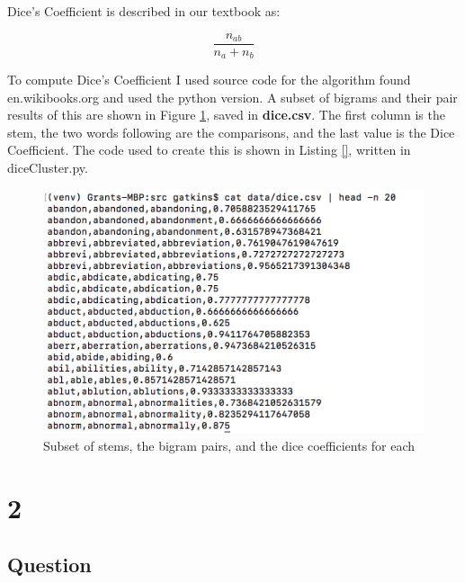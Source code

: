 \documentclass[letterpaper,11pt]{article}
\newcommand*{\srcPath}{../src}%
\begin{document}
Dice's Coefficient is described in our textbook \cite{book} as:

\[
    \frac{n_{ab}}{n_a+n_b}
\]

To compute Dice's Coefficient I used source code for the algorithm found en.wikibooks.org \cite{} and used the python version.
A subset of bigrams and their pair results of this are shown in Figure \ref{fig:dice}, saved in \textbf{dice.csv}.
The first column is the stem, the two words following are the comparisons, and the last value is the Dice Coefficient. 
The code used to create this is shown in Listing \ref{}, written in diceCluster.py.

\begin{figure}[h]
\centering
\includegraphics[scale=0.4]{dice.png}
\caption{Subset of stems, the bigram pairs, and the dice coefficients for each}
\label{fig:dice}
\end{figure}

 

\clearpage


\section*{2}

\subsection*{Question}
\end{document}
